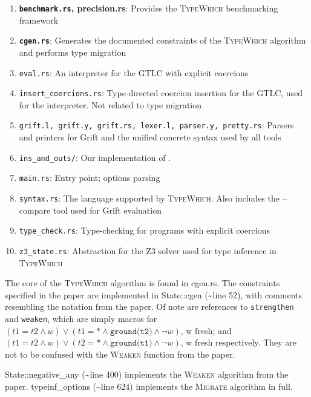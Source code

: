 \documentclass{book}
\newcommand{\system}{\textsc{TypeWhich}\xspace}
\begin{document}
\begin{enumerate}
    \item \textbf{\texttt{benchmark.rs}, precision.rs}: Provides the \system benchmarking
    framework
    \item \textbf{\texttt{cgen.rs}}: Generates the documented constraints of the \system
    algorithm and performs type migration
    \item \texttt{eval.rs}: An interpreter for the GTLC with explicit coercions
    \item \texttt{insert\_coercions.rs}: Type-directed coercion insertion for the GTLC,
    used for the interpreter. Not related to type migration
    \item \texttt{grift.l, grift.y, grift.rs, lexer.l, parser.y, pretty.rs}: Parsers and
    printers for Grift and the unified concrete syntax used by all tools
    \item \texttt{ins\_and\_outs/}: Our implementation of \citet{rastogi:gti}.
    \item \texttt{main.rs}: Entry point; options parsing
    \item \texttt{syntax.rs}: The language supported by \system. Also includes
    the --compare tool used for Grift evaluation
    \item \texttt{type\_check.rs}: Type-checking for programs with explicit coercions
    \item \texttt{z3\_state.rs}: Abstraction for the Z3 solver used for type inference
    in \system
\end{enumerate}

The core of the \system algorithm is found in cgen.rs. The constraints
specified in the paper are implemented in State::cgen (\textasciitilde{}line 52), with
comments resembling the notation from the paper. Of note are references to
\texttt{strengthen} and \texttt{weaken}, which are simply macros for
$(t1 = t2 \land w) \lor (t1 = * \land \texttt{ground(t2)} \land \neg w)$, w fresh; and
$(t1 = t2 \land w) \lor (t2 = * \land \texttt{ground(t1)} \land \neg w)$, w fresh
respectively. They are not to be confused with the \textsc{Weaken} function
from the paper.

State::negative\_any (\textasciitilde{}line 400) implements the \textsc{Weaken} algorithm from the paper.
typeinf\_options (\textasciitilde{}line 624) implements the \textsc{Migrate} algorithm in full.


\end{document}
